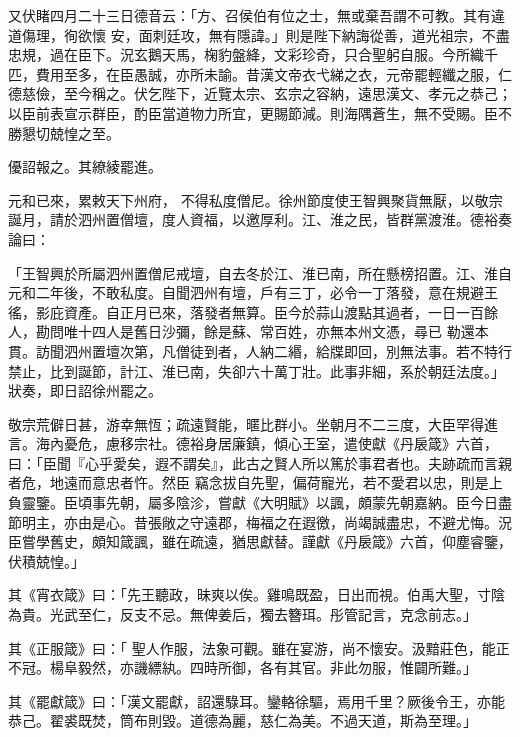 \begin{pinyinscope}
 又伏睹四月二十三日德音云：「方、召侯伯有位之士，無或棄吾謂不可教。其有違道傷理，徇欲懷
 安，面刺廷攻，無有隱諱。」則是陛下納誨從善，道光祖宗，不盡忠規，過在臣下。況玄鵝天馬，椈豹盤絳，文彩珍奇，只合聖躬自服。今所織千匹，費用至多，在臣愚誠，亦所未諭。昔漢文帝衣弋綈之衣，元帝罷輕纖之服，仁德慈儉，至今稱之。伏乞陛下，近覽太宗、玄宗之容納，遠思漢文、孝元之恭己；以臣前表宣示群臣，酌臣當道物力所宜，更賜節減。則海隅蒼生，無不受賜。臣不勝懇切兢惶之至。



 優詔報之。其繚綾罷進。



 元和已來，累敕天下州府，
 不得私度僧尼。徐州節度使王智興聚貨無厭，以敬宗誕月，請於泗州置僧壇，度人資福，以邀厚利。江、淮之民，皆群黨渡淮。德裕奏論曰：



 「王智興於所屬泗州置僧尼戒壇，自去冬於江、淮已南，所在懸榜招置。江、淮自元和二年後，不敢私度。自聞泗州有壇，戶有三丁，必令一丁落發，意在規避王徭，影庇資產。自正月已來，落發者無算。臣今於蒜山渡點其過者，一日一百餘人，勘問唯十四人是舊日沙彌，餘是蘇、常百姓，亦無本州文憑，尋已
 勒還本貫。訪聞泗州置壇次第，凡僧徒到者，人納二緡，給牒即回，別無法事。若不特行禁止，比到誕節，計江、淮已南，失卻六十萬丁壯。此事非細，系於朝廷法度。」狀奏，即日詔徐州罷之。



 敬宗荒僻日甚，游幸無恆；疏遠賢能，暱比群小。坐朝月不二三度，大臣罕得進言。海內憂危，慮移宗社。德裕身居廉鎮，傾心王室，遣使獻《丹扆箴》六首，曰：「臣聞『心乎愛矣，遐不謂矣』，此古之賢人所以篤於事君者也。夫跡疏而言親者危，地遠而意忠者忤。然臣
 竊念拔自先聖，偏荷寵光，若不愛君以忠，則是上負靈鑒。臣頃事先朝，屬多陰沴，嘗獻《大明賦》以諷，頗蒙先朝嘉納。臣今日盡節明主，亦由是心。昔張敞之守遠郡，梅福之在遐徼，尚竭誠盡忠，不避尤悔。況臣嘗學舊史，頗知箴諷，雖在疏遠，猶思獻替。謹獻《丹扆箴》六首，仰塵睿鑒，伏積兢惶。」



 其《宵衣箴》曰：「先王聽政，昧爽以俟。雞鳴既盈，日出而視。伯禹大聖，寸陰為貴。光武至仁，反支不忌。無俾姜后，獨去簪珥。彤管記言，克念前志。」



 其《正服箴》曰：「
 聖人作服，法象可觀。雖在宴游，尚不懷安。汲黯莊色，能正不冠。楊阜毅然，亦譏縹紈。四時所御，各有其官。非此勿服，惟闢所難。」



 其《罷獻箴》曰：「漢文罷獻，詔還騄耳。鑾輅徐驅，焉用千里？厥後令王，亦能恭己。翟裘既焚，筒布則毀。道德為麗，慈仁為美。不過天道，斯為至理。」




\end{pinyinscope}
